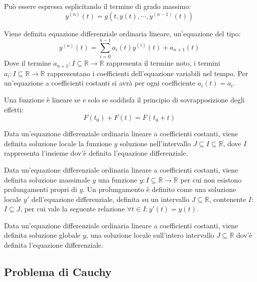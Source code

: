 \documentclass{article}
\numberwithin{equation}{subsection}
\begin{document}
Può essere espressa esplicitando il termine di grado massimo:
\begin{equation*}
    y^{(n)}(t)=g(t,y(t),\cdots,y^{(n-1)}(t))
\end{equation*}

Viene definita equazione differenziale ordinaria lineare, un'equazione del tipo:
\begin{equation}
    y^{(n)}(t)=\displaystyle\sum_{i=0}^{n-1}a_i(t)y^{(i)}(t)+a_{n+1}(t)
\end{equation}
Dove il termine $a_{n+1}:I\subseteq\mathbb{R}\to\mathbb{R}$ rappresenta il termine noto, i termini $a_i:I\subseteq\mathbb{R}\to\mathbb{R}$ rappresentano i coefficienti 
dell'equazione variabili nel tempo. Per un'equazione a coefficienti costanti si avrà per ogni coefficiente $a_i(t)=a_i$. 


Una funzione è lineare se e solo se soddisfa il principio di sovrapposizione degli effetti:
\begin{equation*}
    F(t_0)+F(t)=F(t_0+t)
\end{equation*}



Data un'equazione differenziale ordinaria lineare a coefficienti costanti, viene definita soluzione locale la funzione $y$ soluzione  
nell'intervallo $J\subseteq I\subseteq\mathbb{R}$, dove $I$ rappresenta l'insieme dov'è definita l'equazione differenziale.

Data un'equazione differenziale ordinaria lineare a coefficienti costanti, viene definita soluzione massimale $y$ una funzione $y:I\subseteq\mathbb{R}\to\mathbb{R}$ per cui 
non esistono prolungamenti propri di $y$. Un prolungamento è definito come una soluzione locale $y'$ dell'equazione differenziale, definita su un intervallo $J\subseteq\mathbb{R}$, 
contenente $I$: $I\subseteq J$, per cui vale la seguente relazione $\forall t\in I: y'(t)=y(t)$. 

Data un'equazione differenziale ordinaria lineare a coefficienti costanti, viene definita soluzione globale $y$, una soluzione locale 
sull'intero intervallo $J\subseteq\mathbb{R}$ dov'è definita l'equazione differenziale. 

\subsection{Problema di Cauchy}
\end{document}
